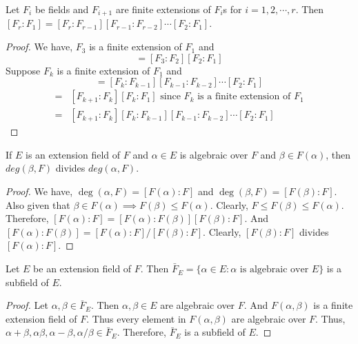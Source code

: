 \begin{corollary}
	Let $F_i$ be fields and $F_{i+1}$ are finite extensions of $F_i$s for $i = 1,2,\cdots,r$.
	Then $[F_r : F_1] = [F_r : F_{r-1}][F_{r-1}:F_{r-2}]\cdots[F_2:F_1]$.
\end{corollary}
\begin{proof}
	We have, $F_3$ is a finite extension of $F_1$ and 
	\begin{equation}
		[F_3:F_1] = [F_3:F_2][F_2:F_1]
	\end{equation}
	Suppose $F_k$ is a finite extension of $F_1$ and 
	\begin{equation}
		[F_k : F_1] = [F_k:F_{k-1}][F_{k-1}:F_{k-2}] \cdots [F_2:F_1]
	\end{equation}
	\begin{align*}
		[F_{k+1}:F_1] = & [F_{k+1} : F_k][F_k : F_1] \text{ since } F_k \text{ is a finite extension of } F_1\\
		= & [F_{k+1}:F_k][F_k:F_{k-1}][F_{k-1}:F_{k-2}] \cdots [F_2:F_1]
	\end{align*}
\end{proof}

\begin{corollary}
	If $E$ is an extension field of $F$ and $\alpha \in E$ is algebraic over $F$ and $\beta \in F(\alpha)$, then $deg(\beta,F)$ divides $deg(\alpha,F)$.
\end{corollary}
\begin{proof}
	We have, $\deg(\alpha,F) = [F(\alpha) : F]$ and $\deg(\beta,F) = [F(\beta):F]$.
	Also given that $\beta \in F(\alpha) \implies F(\beta) \le F(\alpha)$.
	Clearly, $F \le F(\beta) \le F(\alpha)$.
	Therefore, $[F(\alpha) : F] = [F(\alpha):F(\beta)][F(\beta):F]$.
	And $[F(\alpha):F(\beta)] = [F(\alpha):F]/[F(\beta):F]$.
	Clearly, $[F(\beta):F]$ divides $[F(\alpha):F]$.
\end{proof}

\begin{theorem}
	Let $E$ be an extension field of $F$.
	Then $\bar{F}_E = \{ \alpha \in E : \alpha \text{ is algebraic over } E \}$ is a subfield of $E$.
\end{theorem}
\begin{proof}
	Let $\alpha,\beta \in \bar{F}_E$.
	Then $\alpha,\beta \in E$ are algebraic over $F$.
	And $F(\alpha,\beta)$ is a finite extension field of $F$.
	Thus every element in $F(\alpha,\beta)$ are algebraic over $F$.
	Thus, $\alpha+\beta, \alpha\beta,\alpha-\beta,\alpha/\beta \in \bar{F}_E$.
	Therefore, $\bar{F}_E$ is a subfield of $E$.
\end{proof}

